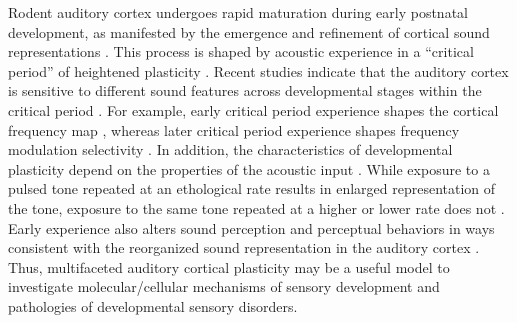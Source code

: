 Rodent auditory cortex undergoes rapid maturation during early postnatal development, as manifested by the emergence and refinement of cortical sound representations \cite{Zhang2001, Chang2005, DeVillers-Sidani2007, Insanally2009}. This process is shaped by acoustic experience in a “critical period” of heightened plasticity \cite{DeVillers-Sidani2007}. Recent studies indicate that the auditory cortex is sensitive to different sound features across developmental stages within the critical period \cite{Insanally2009, Popescu2010}. For example, early critical period experience shapes the cortical frequency map \cite{DeVillers-Sidani2007, Insanally2009}, whereas later critical period experience shapes frequency modulation selectivity \cite{Insanally2009, Insanally2010}. In addition, the characteristics of developmental plasticity depend on the properties of the acoustic input \cite{Chang2003, Zhou2008}. While exposure to a pulsed tone repeated at an ethological rate results in enlarged representation of the tone, exposure to the same tone repeated at a higher or lower rate does not \cite{Kim2009}. Early experience also alters sound perception and perceptual behaviors in ways consistent with the reorganized sound representation in the auditory cortex \cite{Han2007}. Thus, multifaceted auditory cortical plasticity may be a useful model to investigate molecular/cellular mechanisms of sensory development and pathologies of developmental sensory disorders.

